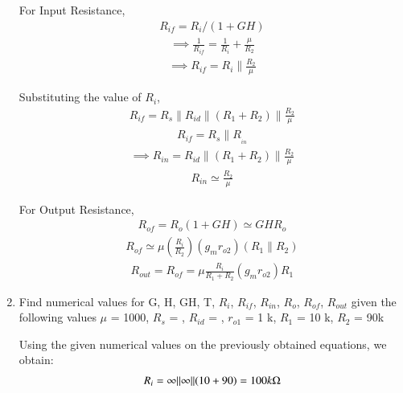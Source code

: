 \begin{enumerate}[label=\thesubsection.\arabic*.,ref=\thesubsection.\theenumi]
For Input Resistance,
\begin{align}
    R_{if}=R_{i} /(1+GH)
\end{align}
\begin{align}
    \implies \frac{1}{R_{i f}}=\frac{1}{R_{i}}+\frac{\mu}{R_{2}}
\end{align}
\begin{align}
    \implies R_{i f}=R_{i} \| \frac{R_{2}}{\mu}
\end{align}

Substituting the value of $R_{i}$,
\begin{align}
    R_{if}=R_{s}\|R_{id}\|(R_{1}+R_{2}) \| \frac{R_{2}}{\mu}
\end{align}
\begin{align}
    R_{if}=R_{s} \| R__{in}
\end{align}
\begin{align}
    \implies R_{in}=R_{i d}\|(R_{1}+R_{2})\| \frac{R_{2}}{\mu}
\end{align}
\begin{align}
    R_{in} \simeq \frac{R_{2}}{\mu}
\end{align}

For Output Resistance,
\begin{align}
    R_{of}=R_{o}(1+GH) \simeq GH R_{o}
\end{align}
\begin{align}
    R_{of} \simeq \mu (\frac{R_{i}}{R_{2}})(g_{m} r_{o 2})(R_{1} \| R_{2})
\end{align}
\begin{align}
    R_{out} = R_{of}=\mu \frac{R_{i}}{R_{1}+R_{2}}(g_{m} r_{o 2}) R_{1}
\end{align}

\item
Find numerical values for G, H, GH, T, $R_{i}$, $R_{if}$, $R_{in}$, $R_{o}$,  $R_{of}$, $R_{out}$ given the following values
$\mu$ = 1000, $R_{s}$ = \inf, $R_{id}$ = \inf, $r_{o1}$ = 1 k\ohm,  $R_{1}$ = 10 k\ohm, $R_{2}$ = 90k\ohm

\solution
Using the given numerical values on the previously obtained equations, we obtain:
\begin{align}
    R_{i}=\infty\|\infty\|(10+90)=100 k\ohm
\end{align}


\end{enumerate}
